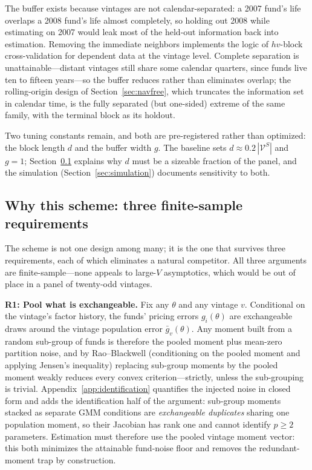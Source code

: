 \documentclass[11pt]{article}
\begin{document}
The buffer exists because vintages are not calendar-separated: a 2007 fund's life overlaps a 2008 fund's life almost completely, so holding out 2008 while estimating on 2007 would leak most of the held-out information back into estimation. Removing the immediate neighbors implements the logic of \(hv\)-block cross-validation for dependent data \citep{Racine2000} at the vintage level. Complete separation is unattainable---distant vintages still share some calendar quarters, since funds live ten to fifteen years---so the buffer reduces rather than eliminates overlap; the rolling-origin design of Section~\ref{sec:navfree}, which truncates the information set in calendar time, is the fully separated (but one-sided) extreme of the same family, with the terminal block as its holdout.

Two tuning constants remain, and both are pre-registered rather than optimized: the block length \(d\) and the buffer width \(g\). The baseline sets \(d\approx 0.2\,|\mathcal V^S|\) and \(g=1\); Section~\ref{sec:optimality} explains why \(d\) must be a sizeable fraction of the panel, and the simulation (Section~\ref{sec:simulation}) documents sensitivity to both.

\subsection{Why this scheme: three finite-sample requirements}
\label{sec:optimality}

The scheme is not one design among many; it is the one that survives three requirements, each of which eliminates a natural competitor. All three arguments are finite-sample---none appeals to large-\(V\) asymptotics, which would be out of place in a panel of twenty-odd vintages.

\textbf{R1: Pool what is exchangeable.} Fix any \(\theta\) and any vintage \(v\). Conditional on the vintage's factor history, the funds' pricing errors \(g_i(\theta)\) are exchangeable draws around the vintage population error \(\bar g_v(\theta)\). Any moment built from a random sub-group of funds is therefore the pooled moment plus mean-zero partition noise, and by Rao--Blackwell (conditioning on the pooled moment and applying Jensen's inequality) replacing sub-group moments by the pooled moment weakly reduces every convex criterion---strictly, unless the sub-grouping is trivial. Appendix~\ref{app:identification} quantifies the injected noise in closed form and adds the identification half of the argument: sub-group moments stacked as separate GMM conditions are \emph{exchangeable duplicates} sharing one population moment, so their Jacobian has rank one and cannot identify \(p\ge 2\) parameters. Estimation must therefore use the pooled vintage moment vector: this both minimizes the attainable fund-noise floor and removes the redundant-moment trap by construction.
\end{document}
